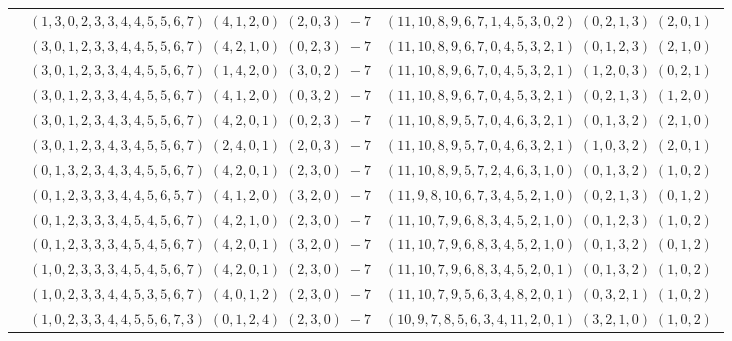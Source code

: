 \documentclass[11pt]{article}
\begin{document}
\begin{longtable}[l]{|c|c|c|}
 \cline{2-3} 
 & $(1 ,3 ,0 ,2 ,3 ,3 ,4 ,4 ,5 ,5 ,6 ,7) \;(4 ,1 ,2 ,0) \;(2 ,0 ,3) \;-7$ & $(11 ,10 ,8 ,9 ,6 ,7 ,1 ,4 ,5 ,3 ,0 ,2) \;(0 ,2 ,1 ,3) \;(2 ,0 ,1) \;$\\ 
 \cline{2-3} 
 & $(3 ,0 ,1 ,2 ,3 ,3 ,4 ,4 ,5 ,5 ,6 ,7) \;(4 ,2 ,1 ,0) \;(0 ,2 ,3) \;-7$ & $(11 ,10 ,8 ,9 ,6 ,7 ,0 ,4 ,5 ,3 ,2 ,1) \;(0 ,1 ,2 ,3) \;(2 ,1 ,0) \;$\\ 
 \cline{2-3} 
 & $(3 ,0 ,1 ,2 ,3 ,3 ,4 ,4 ,5 ,5 ,6 ,7) \;(1 ,4 ,2 ,0) \;(3 ,0 ,2) \;-7$ & $(11 ,10 ,8 ,9 ,6 ,7 ,0 ,4 ,5 ,3 ,2 ,1) \;(1 ,2 ,0 ,3) \;(0 ,2 ,1) \;$\\ 
 \cline{2-3} 
 & $(3 ,0 ,1 ,2 ,3 ,3 ,4 ,4 ,5 ,5 ,6 ,7) \;(4 ,1 ,2 ,0) \;(0 ,3 ,2) \;-7$ & $(11 ,10 ,8 ,9 ,6 ,7 ,0 ,4 ,5 ,3 ,2 ,1) \;(0 ,2 ,1 ,3) \;(1 ,2 ,0) \;$\\ 
 \cline{2-3} 
 & $(3 ,0 ,1 ,2 ,3 ,4 ,3 ,4 ,5 ,5 ,6 ,7) \;(4 ,2 ,0 ,1) \;(0 ,2 ,3) \;-7$ & $(11 ,10 ,8 ,9 ,5 ,7 ,0 ,4 ,6 ,3 ,2 ,1) \;(0 ,1 ,3 ,2) \;(2 ,1 ,0) \;$\\ 
 \cline{2-3} 
 & $(3 ,0 ,1 ,2 ,3 ,4 ,3 ,4 ,5 ,5 ,6 ,7) \;(2 ,4 ,0 ,1) \;(2 ,0 ,3) \;-7$ & $(11 ,10 ,8 ,9 ,5 ,7 ,0 ,4 ,6 ,3 ,2 ,1) \;(1 ,0 ,3 ,2) \;(2 ,0 ,1) \;$\\ 
 \cline{2-3} 
 & $(0 ,1 ,3 ,2 ,3 ,4 ,3 ,4 ,5 ,5 ,6 ,7) \;(4 ,2 ,0 ,1) \;(2 ,3 ,0) \;-7$ & $(11 ,10 ,8 ,9 ,5 ,7 ,2 ,4 ,6 ,3 ,1 ,0) \;(0 ,1 ,3 ,2) \;(1 ,0 ,2) \;$\\ 
 \cline{2-3} 
 & $(0 ,1 ,2 ,3 ,3 ,3 ,4 ,4 ,5 ,6 ,5 ,7) \;(4 ,1 ,2 ,0) \;(3 ,2 ,0) \;-7$ & $(11 ,9 ,8 ,10 ,6 ,7 ,3 ,4 ,5 ,2 ,1 ,0) \;(0 ,2 ,1 ,3) \;(0 ,1 ,2) \;$\\ 
 \cline{2-3} 
 & $(0 ,1 ,2 ,3 ,3 ,3 ,4 ,5 ,4 ,5 ,6 ,7) \;(4 ,2 ,1 ,0) \;(2 ,3 ,0) \;-7$ & $(11 ,10 ,7 ,9 ,6 ,8 ,3 ,4 ,5 ,2 ,1 ,0) \;(0 ,1 ,2 ,3) \;(1 ,0 ,2) \;$\\ 
 \cline{2-3} 
 & $(0 ,1 ,2 ,3 ,3 ,3 ,4 ,5 ,4 ,5 ,6 ,7) \;(4 ,2 ,0 ,1) \;(3 ,2 ,0) \;-7$ & $(11 ,10 ,7 ,9 ,6 ,8 ,3 ,4 ,5 ,2 ,1 ,0) \;(0 ,1 ,3 ,2) \;(0 ,1 ,2) \;$\\ 
 \cline{2-3} 
 & $(1 ,0 ,2 ,3 ,3 ,3 ,4 ,5 ,4 ,5 ,6 ,7) \;(4 ,2 ,0 ,1) \;(2 ,3 ,0) \;-7$ & $(11 ,10 ,7 ,9 ,6 ,8 ,3 ,4 ,5 ,2 ,0 ,1) \;(0 ,1 ,3 ,2) \;(1 ,0 ,2) \;$\\ 
 \cline{2-3} 
 & $(1 ,0 ,2 ,3 ,3 ,4 ,4 ,5 ,3 ,5 ,6 ,7) \;(4 ,0 ,1 ,2) \;(2 ,3 ,0) \;-7$ & $(11 ,10 ,7 ,9 ,5 ,6 ,3 ,4 ,8 ,2 ,0 ,1) \;(0 ,3 ,2 ,1) \;(1 ,0 ,2) \;$\\ 
 \cline{2-3} 
 & $(1 ,0 ,2 ,3 ,3 ,4 ,4 ,5 ,5 ,6 ,7 ,3) \;(0 ,1 ,2 ,4) \;(2 ,3 ,0) \;-7$ & $(10 ,9 ,7 ,8 ,5 ,6 ,3 ,4 ,11 ,2 ,0 ,1) \;(3 ,2 ,1 ,0) \;(1 ,0 ,2) \;$\\ 

\end{longtable}
\end{document}
